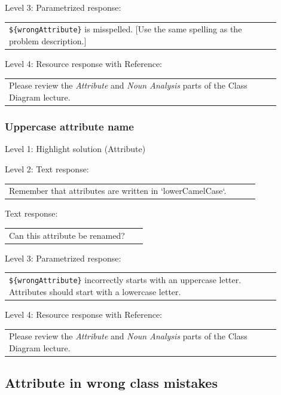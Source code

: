 \noindent Level 3: Parametrized response: \medskip

\begin{tabular}{|p{0.9\linewidth}}
\verb|${wrongAttribute}| is misspelled. [Use the same spelling as the problem description.]
\end{tabular} \medskip

\noindent Level 4: Resource response with Reference: \medskip

\begin{tabular}{|p{0.9\linewidth}}
Please review the \textit{Attribute} and \textit{Noun Analysis} parts of the Class Diagram lecture.
\end{tabular} \medskip


\subsubsection{Uppercase attribute name}

\noindent Level 1: Highlight solution (Attribute) \medskip

\noindent Level 2: Text response: \medskip

\begin{tabular}{|p{0.9\linewidth}}
Remember that attributes are written in `lowerCamelCase`.
\end{tabular} \medskip

Text response: \medskip

\begin{tabular}{|p{0.9\linewidth}}
Can this attribute be renamed?
\end{tabular} \medskip

\noindent Level 3: Parametrized response: \medskip

\begin{tabular}{|p{0.9\linewidth}}
\verb|${wrongAttribute}| incorrectly starts with an uppercase letter. Attributes should start with a lowercase letter.
\end{tabular} \medskip

\noindent Level 4: Resource response with Reference: \medskip

\begin{tabular}{|p{0.9\linewidth}}
Please review the \textit{Attribute} and \textit{Noun Analysis} parts of the Class Diagram lecture.
\end{tabular} \medskip


\subsection{Attribute in wrong class mistakes}

